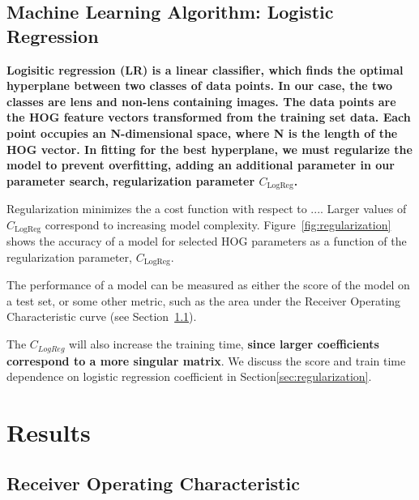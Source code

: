 \documentclass{emulateapj}
\newcommand{\todo}[1]{{\bf\color{blue} #1}}
\begin{document}
\subsection{Machine Learning Algorithm: Logistic Regression}\label{sec:LR}
\todo{ Logisitic regression (LR) is a linear classifier, which finds
  the optimal hyperplane between two classes of data points.  In our
  case, the two classes are lens and non-lens containing images.  The
  data points are the HOG feature vectors transformed from the
  training set data.  Each point occupies an N-dimensional space,
  where N is the length of the HOG vector.  In fitting for the best
  hyperplane, we must regularize the model to prevent overfitting,
  adding an additional parameter in our parameter search,
  regularization parameter $C_\text{LogReg}$.

Regularization minimizes the a cost function with respect to ....
Larger values of $C_\text{LogReg}$ correspond to increasing model
complexity.  Figure~\ref{fig:regularization} shows the accuracy of a
model for selected HOG parameters as a function of the regularization
parameter, $C_\text{LogReg}$.

The performance of a model can be measured as either the score of the
model on a test set, or some other metric, such as the area under the
Receiver Operating Characteristic curve (see Section~\ref{sec:ROC}).

The $C_{LogReg}$ will also increase the training time, \todo{since
  larger coefficients correspond to a more singular matrix}.  We
discuss the score and train time dependence on logistic regression
coefficient in Section\ref{sec:regularization}.
}


\section{Results}
\label{sec:results}

\subsection{Receiver Operating Characteristic}\label{sec:ROC}
\end{document}
